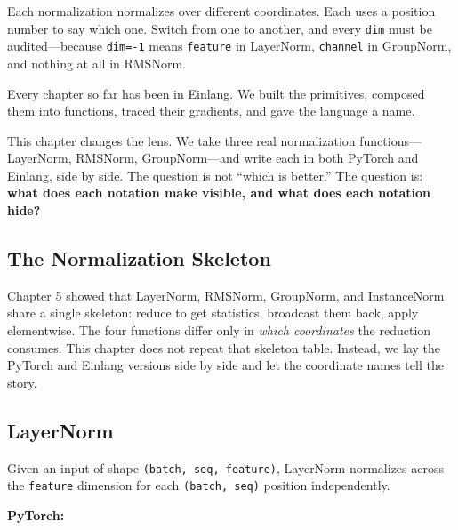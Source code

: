 \documentclass[11pt,titlepage]{article}
\begin{document}
Each normalization normalizes over different coordinates. Each uses a
position number to say which one. Switch from one to another, and every
\texttt{dim} must be audited---because \texttt{dim=-1} means
\texttt{feature} in LayerNorm, \texttt{channel} in GroupNorm, and
nothing at all in RMSNorm.

Every chapter so far has been in Einlang. We built the primitives,
composed them into functions, traced their gradients, and gave the
language a name.

This chapter changes the lens. We take three real normalization
functions---LayerNorm, RMSNorm, GroupNorm---and write each in both
PyTorch and Einlang, side by side. The question is not ``which is
better.'' The question is: \textbf{what does each notation make visible,
and what does each notation hide?}

\vspace{2em}

\hypertarget{the-normalization-skeleton}{%
\subsection{The Normalization
Skeleton}\label{the-normalization-skeleton}}

Chapter 5 showed that LayerNorm, RMSNorm, GroupNorm, and InstanceNorm
share a single skeleton: reduce to get statistics, broadcast them back,
apply elementwise. The four functions differ only in \emph{which
coordinates} the reduction consumes. This chapter does not repeat that
skeleton table. Instead, we lay the PyTorch and Einlang versions side by
side and let the coordinate names tell the story.

\vspace{2em}

\hypertarget{layernorm}{%
\subsection{LayerNorm}\label{layernorm}}

Given an input of shape \texttt{(batch,\ seq,\ feature)}, LayerNorm
normalizes across the \texttt{feature} dimension for each
\texttt{(batch,\ seq)} position independently.

\textbf{PyTorch:}
\end{document}

